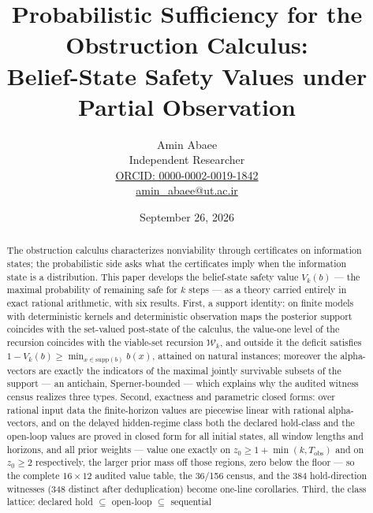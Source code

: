 \documentclass[10pt,twocolumn]{article}
\theoremstyle{plain}
\theoremstyle{definition}
\theoremstyle{remark}
\begin{document}
\title{Probabilistic Sufficiency for the Obstruction Calculus:\\
Belief-State Safety Values under Partial Observation}
\author{Amin Abaee\\[0.35em]
{\small Independent Researcher}\\[0.55em]
{\small\href{https://orcid.org/0000-0002-0019-1842}{ORCID: 0000-0002-0019-1842}}\\[0.3em]
{\small\href{mailto:amin\_abaee@ut.ac.ir}{amin\_abaee@ut.ac.ir}}}
\date{September 26, 2026}
\maketitle

\begin{abstract}
The obstruction calculus characterizes nonviability through certificates on
information states; the probabilistic side asks what the certificates imply
when the information state is a distribution. This paper develops the
belief-state safety value \(V_{k}(b)\) --- the maximal probability of
remaining safe for \(k\) steps --- as a theory carried entirely in exact
rational arithmetic, with six results. First, a support identity: on
finite models with deterministic kernels and deterministic observation
maps the posterior support coincides with the set-valued post-state of the
calculus, the value-one level of the recursion coincides with the
viable-set recursion \(\mathcal{W}_{k}\), and outside it the deficit
satisfies \(1 - V_{k}(b) \ge \min_{x \in \mathrm{supp}(b)} b(x)\), attained
on natural instances; moreover the alpha-vectors are exactly the
indicators of the maximal jointly survivable subsets of the support ---
an antichain, Sperner-bounded --- which explains why the audited witness
census realizes three types. Second, exactness and parametric closed
forms: over rational input data the finite-horizon values are piecewise
linear with rational alpha-vectors, and on the delayed hidden-regime
class both the declared hold-class and the open-loop values are proved in
closed form for all initial states, all window lengths and horizons, and
all prior weights --- value one exactly on
\(z_{0} \ge 1 + \min(k, T_{\mathrm{obs}})\) and on \(z_{0} \ge 2\)
respectively, the larger prior mass off those regions, zero below the
floor --- so the complete \(16 \times 12\) audited value table, the
36/156 census, and the 384 hold-direction witnesses (348 distinct after
deduplication) become one-line corollaries. Third, the class lattice:
declared hold \(\subseteq\) open-loop \(\subseteq\) sequential

\end{abstract}
\end{document}
